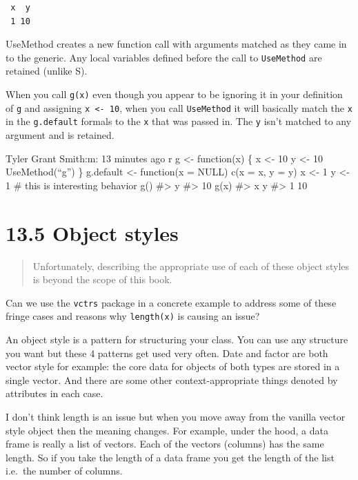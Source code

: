 \documentclass[]{book}
\begin{document}
\begin{verbatim}
 x  y 
 1 10 
\end{verbatim}

UseMethod creates a new function call with arguments matched as they came in to the generic. Any local variables defined before the call to \texttt{UseMethod} are retained (unlike S).

When you call \texttt{g(x)} even though you appear to be ignoring it in your definition of \texttt{g} and assigning \texttt{x\ \textless{}-\ 10}, when you call \texttt{UseMethod} it will basically match the \texttt{x} in the \texttt{g.default} formals to the \texttt{x} that was passed in. The \texttt{y} isn't matched to any argument and is retained.

Tyler Grant Smith:m: 13 minutes ago
r
g \textless{}- function(x) \{
x \textless{}- 10
y \textless{}- 10
UseMethod(``g'')
\}
g.default \textless{}- function(x = NULL) c(x = x, y = y)
x \textless{}- 1
y \textless{}- 1
\# this is interesting behavior
g()
\#\textgreater{} y
\#\textgreater{} 10
g(x)
\#\textgreater{} x y
\#\textgreater{} 1 10

\hypertarget{object-styles}{%
\section*{13.5 Object styles}\label{object-styles}}

\begin{quote}
Unfortunately, describing the appropriate use of each of these object styles is beyond the scope of this book.
\end{quote}

Can we use the \texttt{vctrs} package in a concrete example to address some of these fringe cases and reasons why \texttt{length(x)} is causing an issue?

An object style is a pattern for structuring your class. You can use any structure you want but these 4 patterns get used very often. Date and factor are both vector style for example: the core data for objects of both types are stored in a single vector. And there are some other context-appropriate things denoted by attributes in each case.

I don't think length is an issue but when you move away from the vanilla vector style object then the meaning changes. For example, under the hood, a data frame is really a list of vectors. Each of the vectors (columns) has the same length. So if you take the length of a data frame you get the length of the list i.e.~the number of columns.
\end{document}
